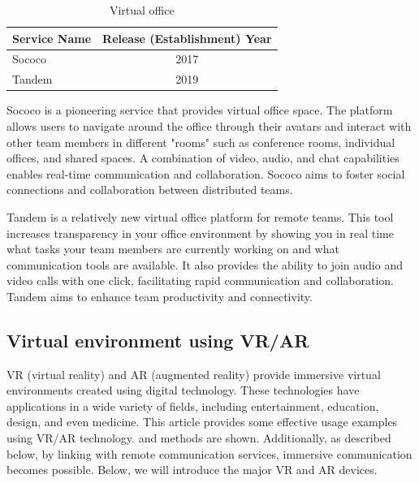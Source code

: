 \documentclass[12pt]{article}
\begin{document}
\begin{table}[h]
    \begin{center}
        \begin{tabular}{|l|c|} \hline
            Service Name & Release (Establishment) Year \\ \hline
            Sococo       & 2017                         \\
            Tandem       & 2019                         \\ \hline
        \end{tabular}
        \caption{Virtual office}
    \end{center}
\end{table}

Sococo is a pioneering service that provides virtual office space. The platform
allows users to navigate around the office through their avatars and interact
with other team members in different "rooms" such as conference rooms,
individual offices, and shared spaces. A combination of video, audio, and chat
capabilities enables real-time communication and collaboration. Sococo aims to
foster social connections and collaboration between distributed teams.

Tandem is a relatively new virtual office platform for remote teams. This tool
increases transparency in your office environment by showing you in real time
what tasks your team members are currently working on and what communication
tools are available. It also provides the ability to join audio and video calls
with one click, facilitating rapid communication and collaboration. Tandem aims
to enhance team productivity and connectivity.

\subsection{Virtual environment using VR/AR}

VR (virtual reality) and AR (augmented reality) provide immersive virtual
environments created using digital technology. These technologies have
applications in a wide variety of fields, including entertainment, education,
design, and even medicine. This article\cite{ref1} provides some effective
usage examples using VR/AR technology. and methods are
shown. Additionally, as described below, by linking with remote communication
services, immersive communication becomes possible. Below, we will introduce
the major VR and AR devices.
\end{document}
